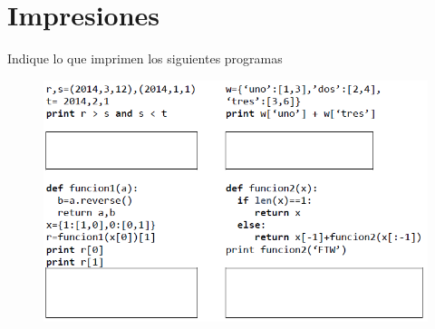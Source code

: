\section{Impresiones}
Indique lo que imprimen los siguientes programas
\begin{figure}[h]
    \centering
    \includegraphics[scale=0.75]{Imagenes/printguia.PNG}
\end{figure}